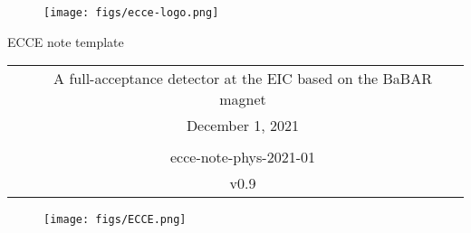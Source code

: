 \renewcommand*\familydefault{\sfdefault}
{\sffamily
\vfill
\vspace{4cm}
\begin{figure}[H]
  \begin{center}
  \texttt{[image: figs/ecce-logo.png]}
\end{center}
\end{figure}

\begin{center}
  \large
  {\LARGE{ECCE note template}}

  \begin{tabular}{cc}
&A full-acceptance detector at the EIC based on the BaBAR magnet \\
&December 1, 2021 \\
&\\
&ecce-note-phys-2021-01\\
&v0.9\\
  \end{tabular}
  \end{center}

\vspace{1cm}

\begin{figure}[H]
  \begin{center}
    \texttt{[image: figs/ECCE.png]}
  \end{center}
\end{figure}
}


\vfill
\renewcommand*\familydefault{\rmdefault}
